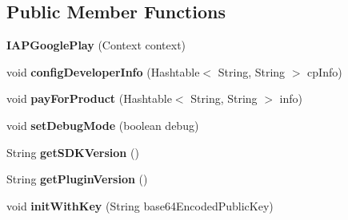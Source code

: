 \subsection*{Public Member Functions}
\begin{DoxyCompactItemize}
\item 
\mbox{\label{classorg_1_1cocos2dx_1_1plugin_1_1IAPGooglePlay_a072259a1e2f656f3dda845ec3b929929}} 
{\bfseries I\+A\+P\+Google\+Play} (Context context)
\item 
\mbox{\label{classorg_1_1cocos2dx_1_1plugin_1_1IAPGooglePlay_a4205f17e5331fe83ab18423054016d68}} 
void {\bfseries config\+Developer\+Info} (Hashtable$<$ String, String $>$ cp\+Info)
\item 
\mbox{\label{classorg_1_1cocos2dx_1_1plugin_1_1IAPGooglePlay_ad995939a416f70114144473272b94c54}} 
void {\bfseries pay\+For\+Product} (Hashtable$<$ String, String $>$ info)
\item 
\mbox{\label{classorg_1_1cocos2dx_1_1plugin_1_1IAPGooglePlay_ae54da24f4ba27f6a4ad716f18e298e6b}} 
void {\bfseries set\+Debug\+Mode} (boolean debug)
\item 
\mbox{\label{classorg_1_1cocos2dx_1_1plugin_1_1IAPGooglePlay_aadaed02af86fb60263585e58921540eb}} 
String {\bfseries get\+S\+D\+K\+Version} ()
\item 
\mbox{\label{classorg_1_1cocos2dx_1_1plugin_1_1IAPGooglePlay_ad0baba7ec093018ba00a87d0a5743bf2}} 
String {\bfseries get\+Plugin\+Version} ()
\item 
\mbox{\label{classorg_1_1cocos2dx_1_1plugin_1_1IAPGooglePlay_aecfa4cddc31fb14e3f9ac06443ba67b5}} 
void {\bfseries init\+With\+Key} (String base64\+Encoded\+Public\+Key)
\item 
\mbox{\label{classorg_1_1cocos2dx_1_1plugin_1_1IAPGooglePlay_acc45cdc6d4f313047fb3198932dae0ce}} 

\end{DoxyCompactItemize}
